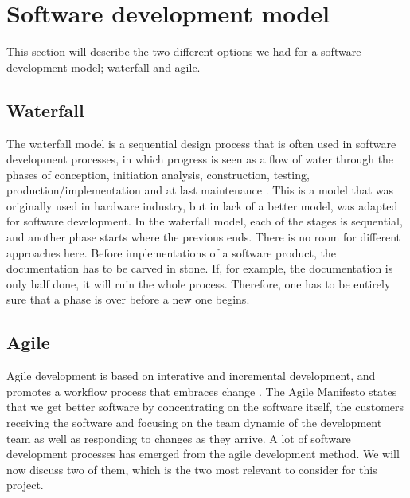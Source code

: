 \newpage

\section{Software development model}\label{sec:devmodel}

This section will describe the two different options we had for a software development model; waterfall and agile.

\subsection{Waterfall}
The waterfall model is a sequential design process that is often used in software development processes, in which progress is seen as a flow of water through the phases of conception, initiation analysis, construction, testing, production/implementation and at last maintenance \cite{bib:waterfall}. 
\newline
\newline
This is a model that was originally used in hardware industry, but in lack of a better model, was adapted for software development. In the waterfall model, each of the stages is sequential, and another phase starts where the previous ends. There is no room for different approaches here. Before implementations of a software product, the documentation has to be carved in stone. If, for example, the documentation is only half done, it will ruin the whole process. Therefore, one has to be entirely sure that a phase is over before a new one begins. 

\subsection{Agile}
Agile development is based on interative and incremental development, and promotes a workflow process that embraces change \cite{bib:agile}. The Agile Manifesto states that we get better software by concentrating on the software itself, the customers receiving the software and focusing on the team dynamic of the development team as well as responding to changes as they arrive. A lot of software development processes has emerged from the agile development method. We will now discuss two of them, which is the two most relevant to consider for this project. 


